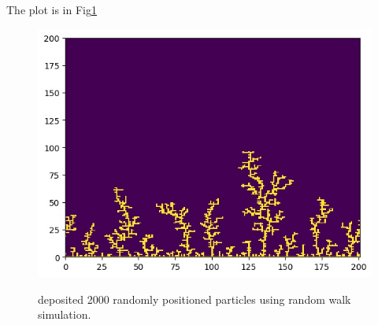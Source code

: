 \documentclass[12pt]{article}
\begin{document}
	The plot is in Fig\ref{fig:ald}
	\begin{figure}[h!]
		\includegraphics[width=0.9\linewidth]{../p6/ald.jpg}
		\label{fig:ald}
		\caption{deposited 2000 randomly positioned particles using random walk simulation.}
	\end{figure}
\end{document}
